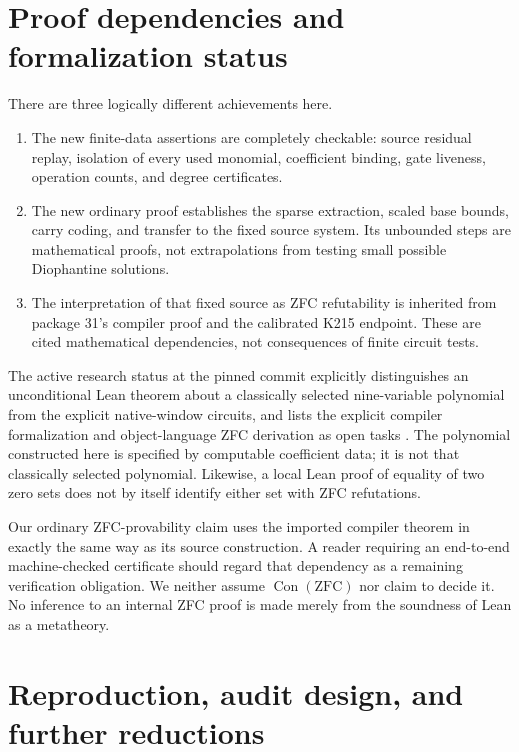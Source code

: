 \documentclass[11pt]{article}
\theoremstyle{definition}\newtheorem{definition}[theorem]{Definition}
\newcommand{\Con}{\operatorname{Con}(\mathrm{ZFC})}
\begin{document}
\section{Proof dependencies and formalization status}
\label{sec:boundary}

There are three logically different achievements here.

\begin{enumerate}
\item The new finite-data assertions are completely checkable: source
residual replay, isolation of every used monomial, coefficient binding,
gate liveness, operation counts, and degree certificates.
\item The new ordinary proof establishes the sparse extraction, scaled
base bounds, carry coding, and transfer to the fixed source system.
Its unbounded steps are mathematical proofs, not extrapolations from
testing small possible Diophantine solutions.
\item The interpretation of that fixed source as ZFC refutability is
inherited from package 31's compiler proof and the calibrated K215
endpoint. These are cited mathematical dependencies, not consequences
of finite circuit tests.
\end{enumerate}

The active research status at the pinned commit explicitly distinguishes
an unconditional Lean theorem about a classically selected nine-variable
polynomial from the explicit native-window circuits, and lists the
explicit compiler formalization and object-language ZFC derivation as
open tasks \cite{status}. The polynomial constructed here is specified
by computable coefficient data; it is not that classically selected
polynomial. Likewise, a local Lean proof of equality of two zero sets
does not by itself identify either set with ZFC refutations.

Our ordinary ZFC-provability claim uses the imported compiler theorem
in exactly the same way as its source construction. A reader requiring
an end-to-end machine-checked certificate should regard that dependency
as a remaining verification obligation. We neither assume
$\Con$ nor claim to decide it. No inference to an internal ZFC proof is
made merely from the soundness of Lean as a metatheory.

\section{Reproduction, audit design, and further reductions}
\end{document}
